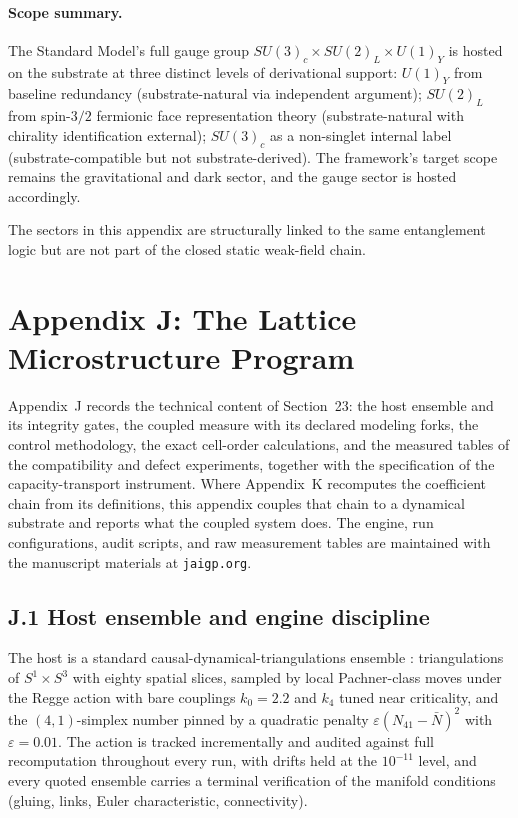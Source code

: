 \documentclass[11pt]{article}
\begin{document}
\paragraph{Scope summary.}
The Standard Model's full gauge group $SU(3)_c\times SU(2)_L\times U(1)_Y$ is hosted on the substrate at three distinct levels of derivational support: $U(1)_Y$ from baseline redundancy (substrate-natural via independent argument); $SU(2)_L$ from spin-$3/2$ fermionic face representation theory (substrate-natural with chirality identification external); $SU(3)_c$ as a non-singlet internal label (substrate-compatible but not substrate-derived). The framework's target scope remains the gravitational and dark sector, and the gauge sector is hosted accordingly.

The sectors in this appendix are structurally linked to the same entanglement logic but are not part of the closed static weak-field chain.

\section*{Appendix J: The Lattice Microstructure Program}

Appendix~J records the technical content of Section~23: the host ensemble and its integrity gates, the coupled measure with its declared modeling forks, the control methodology, the exact cell-order calculations, and the measured tables of the compatibility and defect experiments, together with the specification of the capacity-transport instrument. Where Appendix~K recomputes the coefficient chain from its definitions, this appendix couples that chain to a dynamical substrate and reports what the coupled system does. The engine, run configurations, audit scripts, and raw measurement tables are maintained with the manuscript materials at \texttt{jaigp.org}.

\subsection*{J.1 Host ensemble and engine discipline}

The host is a standard causal-dynamical-triangulations ensemble \citep{AmbjornJurkiewiczLoll2004,AmbjornGJL2012}: triangulations of $S^1\times S^3$ with eighty spatial slices, sampled by local Pachner-class moves under the Regge action with bare couplings $k_0=2.2$ and $k_4$ tuned near criticality, and the $(4,1)$-simplex number pinned by a quadratic penalty $\varepsilon(N_{41}-\bar N)^2$ with $\varepsilon=0.01$. The action is tracked incrementally and audited against full recomputation throughout every run, with drifts held at the $10^{-11}$ level, and every quoted ensemble carries a terminal verification of the manifold conditions (gluing, links, Euler characteristic, connectivity).
\end{document}
